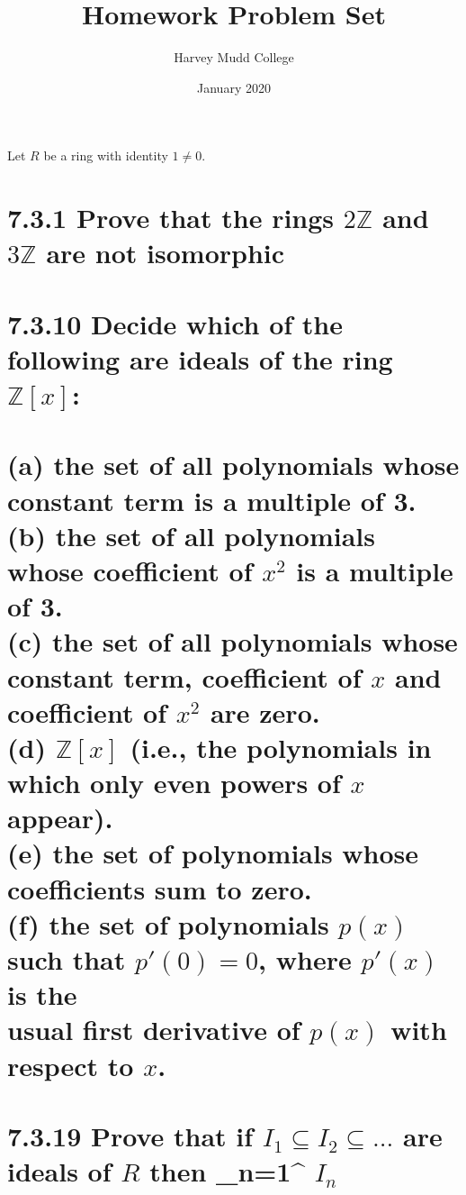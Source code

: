 \documentclass{article}
\title{\textbf{Homework Problem Set \mypound 1}}
\author{Harvey Mudd College}
\date{January 2020}
\begin{document}
\maketitle

\large{} Let $R$ be a ring with identity $1\neq0.$

\section*{\hspace{-0.6cm}7.3.1\Large{} \normalfont Prove that the rings $2\mathbb{Z}$ and $3\mathbb{Z}$ are not isomorphic}

\newpage

\section*{\hspace{-1.55cm}7.3.10\Large{} \normalfont Decide which of the following are ideals of the ring $\mathbb{Z}[x]$:
\\
\\\large \hspace*{-1cm} (a) the set of all polynomials whose constant term is a multiple of 3.
\\
         \hspace*{-1cm} (b) the set of all polynomials whose coefficient of $x^2$ is a multiple of  3.
\\
         \hspace*{-1cm} (c) the set of all polynomials whose constant term, coefficient of $x$ and \hspace*{-0.16cm}coefficient of $x^2$ are zero.
\\
         \hspace*{-1cm} (d) $\mathbb{Z}[x]$ (i.e., the polynomials in which only even powers of $x$ appear).
\\      
         \hspace*{-1cm} (e) the set of polynomials whose coefficients sum to zero.
\\       
         \hspace*{-1cm} (f) the set of polynomials $p(x)$ such that $p'(0)=0$, where $p'(x)$ is the \\ 
         \hspace*{-0.4cm} usual first derivative of $p(x)$ with respect to $x$.}
         
\newpage

\color{red}
\section*{\hspace{-1cm}7.3.19\Large{} \color{black} \normalfont Prove that if $I_1\subseteq I_2 \subseteq ...$ are ideals of $R$ then {\cup_{n=1}}^ \infty \textit{$I_n$} } \color{black}
\end{document}
